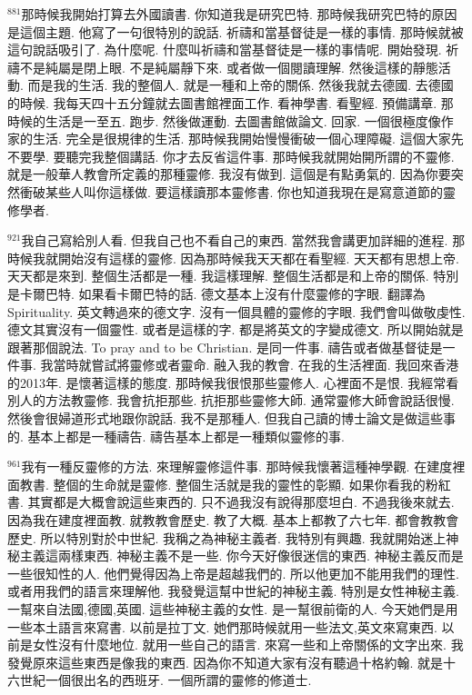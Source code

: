 \documentclass{book}
\begin{document}
$^{881}$那時候我開始打算去外國讀書.
你知道我是研究巴特.
那時候我研究巴特的原因是這個主題.
他寫了一句很特別的說話.
祈禱和當基督徒是一樣的事情.
那時候就被這句說話吸引了.
為什麼呢.
什麼叫祈禱和當基督徒是一樣的事情呢.
開始發現.
祈禱不是純屬是閉上眼.
不是純屬靜下來.
或者做一個閱讀理解.
然後這樣的靜態活動.
而是我的生活.
我的整個人.
就是一種和上帝的關係.
然後我就去德國.
去德國的時候.
我每天四十五分鐘就去圖書館裡面工作.
看神學書.
看聖經.
預備講章.
那時候的生活是一至五.
跑步.
然後做運動.
去圖書館做論文.
回家.
一個很極度像作家的生活.
完全是很規律的生活.
那時候我開始慢慢衝破一個心理障礙.
這個大家先不要學.
要聽完我整個講話.
你才去反省這件事.
那時候我就開始開所謂的不靈修.
就是一般華人教會所定義的那種靈修.
我沒有做到.
這個是有點勇氣的.
因為你要突然衝破某些人叫你這樣做.
要這樣讀那本靈修書.
你也知道我現在是寫意道節的靈修學者.

$^{921}$我自己寫給別人看.
但我自己也不看自己的東西.
當然我會講更加詳細的進程.
那時候我就開始沒有這樣的靈修.
因為那時候我天天都在看聖經.
天天都有思想上帝.
天天都是來到.
整個生活都是一種.
我這樣理解.
整個生活都是和上帝的關係.
特別是卡爾巴特.
如果看卡爾巴特的話.
德文基本上沒有什麼靈修的字眼.
翻譯為Spirituality.
英文轉過來的德文字.
沒有一個具體的靈修的字眼.
我們會叫做敬虔性.
德文其實沒有一個靈性.
或者是這樣的字.
都是將英文的字變成德文.
所以開始就是跟著那個說法.
To pray and to be Christian.
是同一件事.
禱告或者做基督徒是一件事.
我當時就嘗試將靈修或者靈命.
融入我的教會.
在我的生活裡面.
我回來香港的2013年.
是懷著這樣的態度.
那時候我很恨那些靈修人.
心裡面不是恨.
我經常看別人的方法教靈修.
我會抗拒那些.
抗拒那些靈修大師.
通常靈修大師會說話很慢.
然後會很婦道形式地跟你說話.
我不是那種人.
但我自己讀的博士論文是做這些事的.
基本上都是一種禱告.
禱告基本上都是一種類似靈修的事.

$^{961}$我有一種反靈修的方法.
來理解靈修這件事.
那時候我懷著這種神學觀.
在建度裡面教書.
整個的生命就是靈修.
整個生活就是我的靈性的彰顯.
如果你看我的粉紅書.
其實都是大概會說這些東西的.
只不過我沒有說得那麼坦白.
不過我後來就去.
因為我在建度裡面教.
就教教會歷史.
教了大概.
基本上都教了六七年.
都會教教會歷史.
所以特別對於中世紀.
我稱之為神秘主義者.
我特別有興趣.
我就開始迷上神秘主義這兩樣東西.
神秘主義不是一些.
你今天好像很迷信的東西.
神秘主義反而是一些很知性的人.
他們覺得因為上帝是超越我們的.
所以他更加不能用我們的理性.
或者用我們的語言來理解他.
我發覺這幫中世紀的神秘主義.
特別是女性神秘主義.
一幫來自法國,德國,英國.
這些神秘主義的女性.
是一幫很前衛的人.
今天她們是用一些本土語言來寫書.
以前是拉丁文.
她們那時候就用一些法文,英文來寫東西.
以前是女性沒有什麼地位.
就用一些自己的語言.
來寫一些和上帝關係的文字出來.
我發覺原來這些東西是像我的東西.
因為你不知道大家有沒有聽過十格約翰.
就是十六世紀一個很出名的西班牙.
一個所謂的靈修的修道士.
\end{document}
